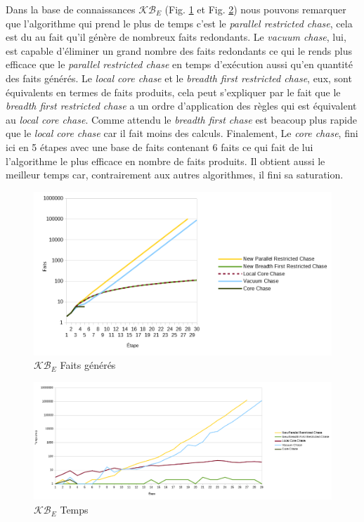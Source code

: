 Dans la base de connaissances $\mathcal{KB}_E$ (Fig. \ref{fig:examplenewfacts} et  Fig. \ref{fig:examplenewtime}) nous pouvons remarquer que l'algorithme qui prend le plus de temps c'est le \textit{parallel restricted chase}, cela est du au fait qu'il génère de nombreux faits redondants. Le \textit{vacuum chase}, lui, est capable d'éliminer un grand nombre des faits redondants ce qui le rends plus efficace que le \textit{parallel restricted chase} en temps d'exécution aussi qu'en quantité des faits générés. Le \textit{local core chase} et le \textit{breadth first restricted chase}, eux, sont équivalents en termes de faits produits, cela peut s'expliquer par le fait que le \textit{breadth first restricted chase} a un ordre d'application des règles qui est équivalent au \textit{local core chase}. Comme attendu le \textit{breadth first chase} est beacoup plus rapide que le \textit{local core chase} car il fait moins des calculs. Finalement, Le \textit{core chase}, fini ici en 5 étapes avec une base de faits contenant 6 faits ce qui fait de lui l'algorithme le plus efficace en nombre de faits produits. Il obtient aussi le meilleur temps car, contrairement aux autres algorithmes, il fini sa saturation.

\begin{figure}
\centering
\includegraphics[width=\textwidth]{pictures/benchmark_new/examplenewfacts.png}
\caption{$\mathcal{KB}_E$ Faits générés}
\label{fig:examplenewfacts}
\end{figure}

\begin{figure}
\centering
\includegraphics[width=\textwidth]{pictures/benchmark_new/examplenewtimes.png}
\caption{$\mathcal{KB}_E$ Temps}
\label{fig:examplenewtime}
\end{figure}

